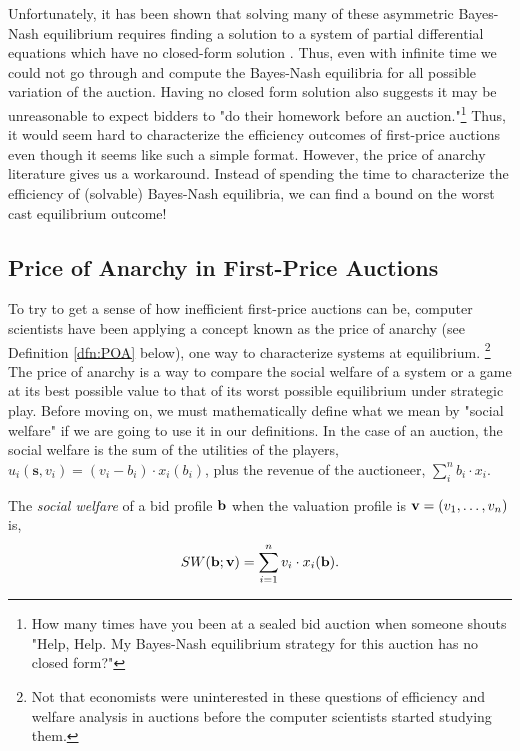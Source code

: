 \documentclass[12pt,twoside]{reedthesis}
\begin{document}
 Unfortunately, it has been shown that solving many of these asymmetric Bayes-Nash equilibrium requires finding a solution to a system of partial differential equations which have no closed-form solution \citep{Roughgarden2017}. Thus, even with infinite time we could not go through and compute the Bayes-Nash equilibria for all possible variation of the auction. Having no closed form solution also suggests it may be unreasonable to expect bidders to "do their homework before an auction."\footnote{How many times have you been at a sealed bid auction when someone shouts "Help, Help. My Bayes-Nash equilibrium strategy for this auction has no closed form?"} Thus, it would seem hard to characterize the efficiency outcomes of first-price auctions even though it seems like such a simple format. However, the price of anarchy literature gives us a workaround. Instead of spending the time to characterize the efficiency of (solvable) Bayes-Nash equilibria, we can find a bound on the worst cast equilibrium outcome!

\subsection{Price of Anarchy in First-Price Auctions}  
To try to get a sense of how inefficient first-price auctions can be, computer scientists have been applying a concept known as the price of anarchy (see Definition \ref{dfn:POA} below), one way to characterize systems at equilibrium. \footnote{Not that economists were uninterested in these questions of efficiency and welfare analysis in auctions before the computer scientists started studying them.} The price of anarchy is a way to compare the social welfare of a system or a game at its best possible value to that of its worst possible equilibrium under strategic play. Before moving on, we must mathematically define what we mean by "social welfare" if we are going to use it in our definitions. In the case of an auction, the social welfare is the sum of the utilities of the players, $u_i(\textbf{s}, v_i) = (v_i - b_i) \cdot x_i(b_i)$, plus the revenue of the auctioneer, $\sum_{i}^{n} b_i \cdot x_i$. 

\begin{dfn}
	The \textit{social welfare} of a bid profile $\textbf{b}$ when the valuation profile is $\textbf{v} = (v_1, \ldots, v_n)$ is, 
	$$ SW(\textbf{b};\textbf{v}) = \sum_{i=1}^{n} v_i \cdot x_i (\textbf{b}).$$
	\label{dfn:SocialWelfare}
\end{dfn}
\end{document}

